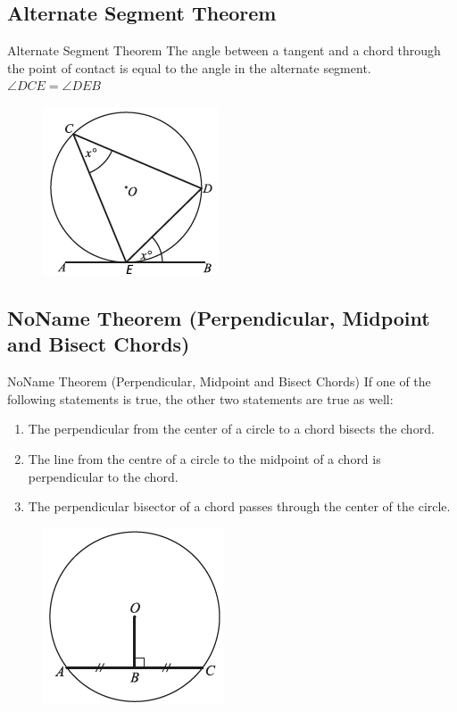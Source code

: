 \documentclass{beamer}
\begin{document}
\subsection{Alternate Segment Theorem}
\begin{frame}{Alternate Segment Theorem}
The angle between a tangent and a chord through the point of contact is equal to the angle in the alternate segment.\\
$\angle DCE = \angle DEB$
\begin{figure}[h!]
	\centering
	\includegraphics[height=0.5\textheight]{Graphics/Week_13/AlternateSegment.png}
\end{figure}
\end{frame}

\subsection{NoName Theorem (Perpendicular, Midpoint and Bisect Chords)}
\begin{frame}{NoName Theorem (Perpendicular, Midpoint and Bisect Chords)}
If one of the following statements is true, the other two statements are true as well:
\footnotesize
\begin{enumerate}
	\item The perpendicular from the center of a circle to a chord bisects the chord.
	\item The line from the centre of a circle to the midpoint of a chord is perpendicular to the chord.
	\item The perpendicular bisector of a chord passes through the center of the circle.
\end{enumerate}
\begin{figure}[h!]
	\centering
	\includegraphics[height=0.4\textheight]{Graphics/Week_13/MidBisectChord.png}
\end{figure}
\normalsize
\end{frame}
\end{document}
